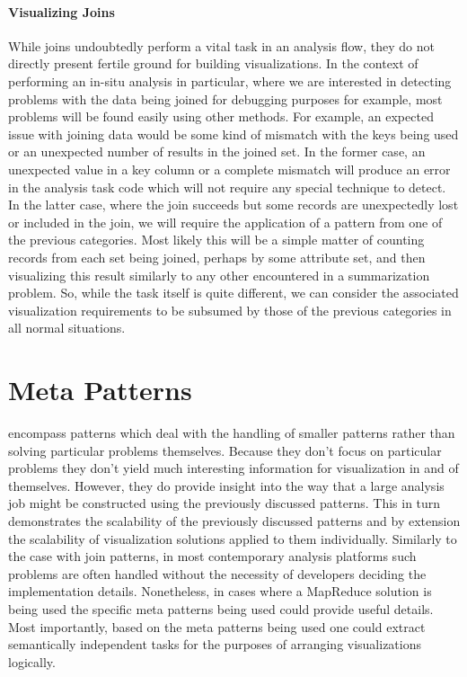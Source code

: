\paragraph{Visualizing Joins}
While joins undoubtedly perform a vital task in an analysis flow, they do not directly present fertile ground for building visualizations. In the context of performing an in-situ analysis in particular, where we are interested in detecting problems with the data  being joined for debugging purposes for example, most problems will be found easily using other methods. For example, an expected issue with joining data would be some kind of mismatch with the keys being used or an unexpected number of results in the joined set. In the former case, an unexpected value in a key column or a complete mismatch will produce an error in the analysis task code which will not require any special technique to detect. In the latter case, where the join succeeds but some records are unexpectedly lost or included in the join, we will require the application of a pattern from one of the previous categories. Most likely this will be a simple matter of counting records from each set being joined, perhaps by some attribute set, and then visualizing this result similarly to any other encountered in a summarization problem. So, while the task itself is quite different, we can consider the associated visualization requirements to be subsumed by those of the previous categories in all normal situations.

\section{Meta Patterns}
\label{sec:metapatterns}
 encompass patterns which deal with the handling of smaller patterns rather than solving particular problems themselves. Because they don't focus on particular problems they don't yield much interesting information for visualization in and of themselves. However, they do provide insight into the way that a large analysis job might be constructed using the previously discussed patterns. This in turn demonstrates the scalability of the previously discussed patterns and by extension the scalability of visualization solutions applied to them individually. Similarly to the case with join patterns, in most contemporary analysis platforms such problems are often handled without the necessity of developers deciding the implementation details. Nonetheless, in cases where a MapReduce solution is being used the specific meta patterns being used could provide useful details. Most importantly, based on the meta patterns being used one could extract semantically independent tasks for the purposes of arranging visualizations logically.

